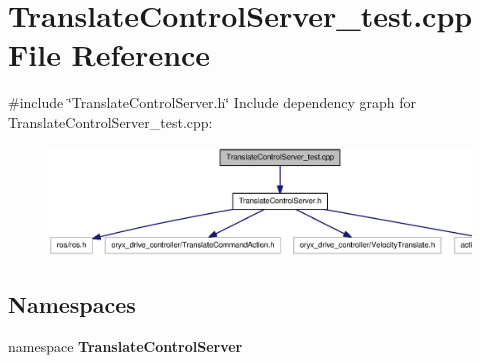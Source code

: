 \section{\-Translate\-Control\-Server\-\_\-test.\-cpp \-File \-Reference}
\label{TranslateControlServer__test_8cpp}
{\ttfamily \#include \char`\"{}\-Translate\-Control\-Server.\-h\char`\"{}}\*
\-Include dependency graph for \-Translate\-Control\-Server\-\_\-test.\-cpp\-:
\nopagebreak
\begin{figure}[H]
\begin{center}
\leavevmode
\includegraphics[width=350pt]{TranslateControlServer__test_8cpp__incl}
\end{center}
\end{figure}
\subsection*{\-Namespaces}
\begin{DoxyCompactItemize}
\item 
namespace {\bf \-Translate\-Control\-Server}
\end{DoxyCompactItemize}

